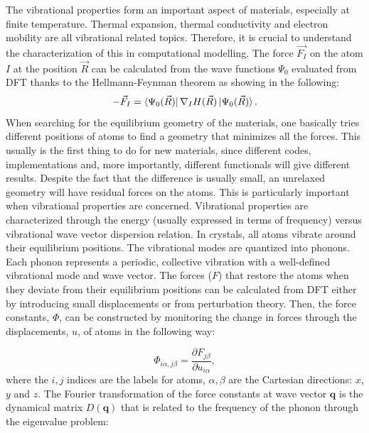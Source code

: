 The vibrational properties form an important aspect of materials, especially at finite temperature. Thermal expansion, thermal conductivity and electron mobility are all vibrational related topics. Therefore, it is crucial to understand the characterization of this in computational modelling. The force $\vec{F_I}$ on the atom $I$ at the position $\vec{R}$ can be calculated from the wave functions $\Psi_0$ evaluated from DFT thanks to the Hellmann-Feynman theorem as showing in the following: 
\begin{equation}
-\vec{F}_I=\bra{\Psi_0(\vec{R})}\nabla_I H(\vec{R})\ket{\Psi_0(\vec{R})}.
\end{equation}
When searching for the equilibrium geometry of the materials, one basically tries different positions of atoms to find a geometry that minimizes all the forces. This usually is the first thing to do for new materials, since different codes, implementations and, more importantly, different functionals will give different results. Despite the fact that the difference is usually small, an unrelaxed geometry will have residual forces on the atoms. This is particularly important when vibrational properties are concerned. Vibrational properties are characterized through the energy (usually expressed in terms of frequency) versus vibrational wave vector dispersion relation.  In crystals,  all atoms vibrate around their equilibrium positions. The vibrational modes are quantized into phonons. Each phonon represents a periodic, collective vibration with a well-defined vibrational mode and wave vector. The forces ($F$) that restore the atoms when they deviate from their equilibrium positions can be calculated from DFT either by introducing small displacements or from perturbation theory. Then, the force constants, $\Phi$, can be constructed by monitoring the change in forces through the displacements, $u$, of atoms in the following way:

\begin{equation}
\Phi_{i\alpha,j\beta}= \frac{\partial F_{j\beta}}{\partial u_{i\alpha}},
\end{equation} 
where the $i,j$ indices are the labels for atoms, $\alpha,\beta$ are the Cartesian directions: $x$, $y$ and $z$. The Fourier transformation of the force constants at wave vector $\mathbf{q}$ is the dynamical matrix $D(\mathbf{q})$ that is related to the frequency of the phonon through the eigenvalue problem:

